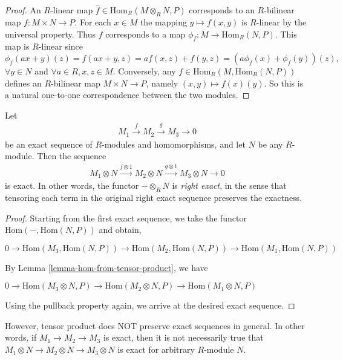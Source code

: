 \begin{proof}
An $R$-linear map $\hat{f}\in \text{Hom}_R(M\otimes_R N, P)$ corresponds to an 
$R$-bilinear map $f:M\times N\rightarrow P$. For
each $x\in M$ the mapping $y\mapsto f(x,y)$ is $R$-linear by the universal 
property. Thus $f$ corresponds to a
map $\phi_f:M\rightarrow \text{Hom}_R(N,P)$. This map is $R$-linear since
$$
\phi_f(ax+y)(z)=f(ax+y,z)=af(x,z)+f(y,z)=(a\phi_f(x)+\phi_f(y))(z),
$$
$\forall y\in N$ and $\forall a\in R, x,z\in M$. Conversely, any 
$f\in\text{Hom}_R(M,\text{Hom}_R(N,P))$ defines an $R$-bilinear
map $M\times N\rightarrow P$, namely $(x,y)\mapsto f(x)(y)$.
So this is a natural one-to-one correspondence between the
two modules.
\end{proof}

\begin{lemma}
\label{lemma-tensor-product-exact}
Let
\begin{align}
M_1\xrightarrow{f} M_2\xrightarrow{g} M_3\rightarrow 0
\end{align}
be an exact sequence of $R$-modules and homomorphisms, and let $N$ be any 
$R$-module. Then the sequence
\begin{align}
\label{2ndex}
M_1\otimes N\xrightarrow{f\otimes 1} M_2\otimes N \xrightarrow{g\otimes 1} 
M_3\otimes N\rightarrow 0
\end{align}
is exact. In other words, the functor $- \otimes_{R} N$ is \textit{right 
exact}, in the sense that tensoring
each term in the original right exact sequence preserves the exactness.
\end{lemma}

\begin{proof}
Starting from the first exact sequence, we take the functor
$\text{Hom}(-, \text{Hom}(N,P))$ and obtain,
\begin{center}
$
0\rightarrow
\text{Hom}(M_3,\text{Hom}(N,P))\rightarrow
\text{Hom}(M_2,\text{Hom}(N,P))\rightarrow
\text{Hom}(M_1,\text{Hom}(N,P))$
\end{center}
By Lemma \ref{lemma-hom-from-tensor-product}, we have
\begin{center}
$0\rightarrow\text{Hom}(M_3\otimes N,P)\rightarrow\text{Hom}(M_2\otimes 
N,P)\rightarrow\text{Hom}(M_1\otimes N,P)$
\end{center}
Using the pullback property again, we arrive at the desired exact sequence.
\end{proof}

\begin{remark}
\label{remark-tensor-product-not-exact}
However, tensor product does NOT preserve exact sequences in general.
In other words, if $M_1\rightarrow M_2\rightarrow M_3$ is
exact, then it is not necessarily true that
$M_1\otimes N\rightarrow M_2\otimes N\rightarrow M_3\otimes N$
is exact for arbitrary $R$-module $N$.
\end{remark}

